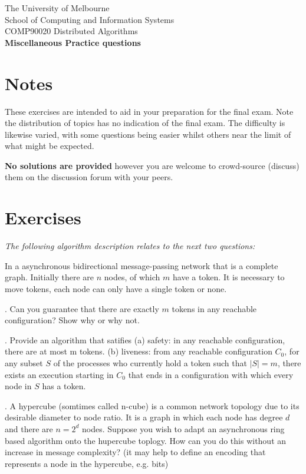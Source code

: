 \documentclass[parskip=full+, paper=a4, fontsize=12pt, ]{scrartcl}
\newcounter{question}
\newcommand{\question}[1]{
    \stepcounter{question}
    \thequestion. #1 \hfill
}
\begin{document}
\begin{center}
    { The University of Melbourne
        \\
        School of Computing and Information Systems
        \\
    COMP90020 Distributed Algorithms}
    \bigskip \\
    {\Large\bf Miscellaneous Practice questions}
    \bigskip \\
\end{center}

\section*{Notes}

These exercises are intended to aid in your preparation for the final exam. Note the distribution of topics has no indication of the final exam. The difficulty is likewise varied, with some questions being easier whilst others near the limit of what might be expected.

\textbf{No solutions are provided} however you are welcome to crowd-source (discuss) them on the discussion forum with your peers.

\section*{Exercises}

\setcounter{question}{1}

\textit{The following algorithm description relates to the next two questions:}


In a asynchronous bidirectional message-passing network that is a complete graph. Initially there are $n$ nodes, of which $m$ have a token. It is necessary to move tokens, each node can only have a single token or none.


\question{Can you guarantee that there are exactly $m$ tokens in any reachable configuration? Show why or why not.}


\question{Provide an algorithm that satifies (a) safety: in any reachable configuration, there are at most m tokens. (b) liveness: from any reachable configuration $C_0$, for any subset $S$ of the processes who currently hold a token such that $|S| = m$, there exists an execution starting in $C_0$ that ends in a configuration with which every node in $S$ has a token.}


\question{A hypercube (somtimes called n-cube) is a common network topology due to its desirable diameter to node ratio. It is a graph in which each node has degree $d$ and there are $n = 2^d$ nodes. Suppose you wish to adapt an asynchronous ring based algorithm onto the hupercube toplogy. How can you do this without an increase in message complexity? (it may help to define an encoding that represents a node in the hypercube, e.g. bits)}
\end{document}
